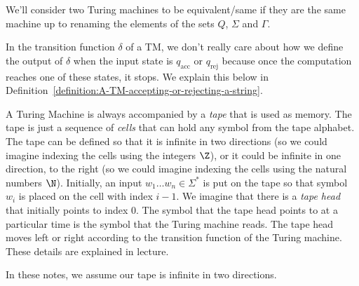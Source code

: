 \begin{note} \label{note:Equivalence-of-Turing-machines}
We'll consider two Turing machines to be equivalent/same if they are the same machine up to renaming the elements of the sets $Q$, $\Sigma$ and $\Gamma$.
\end{note}


\begin{note} \label{note:No-transition-out-of-accepting-and-rejecting-states}
In the transition function $\delta$ of a TM, we don't really care about how we define the output of $\delta$ when the input state is $q_\text{acc}$ or $q_\text{rej}$ because once the computation reaches one of these states, it stops. We explain this below in Definition~\ref{definition:A-TM-accepting-or-rejecting-a-string}.
\end{note}


\begin{important} \label{important:A-Turing-machine-uses-a-tape}
A Turing Machine is always accompanied by a \emph{tape} that is used as memory. The tape is just a sequence of \emph{cells} that can hold any symbol from the tape alphabet. The tape can be defined so that it is infinite in two directions (so we could imagine indexing the cells using the integers $\Z$), or it could be infinite in one direction, to the right (so we could imagine indexing the cells using the natural numbers $\N$). Initially, an input $w_1\ldots w_n \in \Sigma^*$ is put on the tape so that symbol $w_i$ is placed on the cell with index $i-1$. We imagine that there is a \emph{tape head} that initially points to index 0. The symbol that the tape head points to at a particular time is the symbol that the Turing machine reads. The tape head moves left or right according to the transition function of the Turing machine. These details are explained in lecture.

In these notes, we assume our tape is infinite in two directions. 
\end{important}


